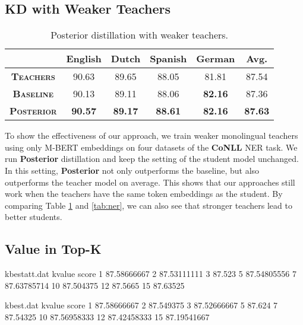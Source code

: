\documentclass[11pt,a4paper]{article}
\begin{document}
\subsection{KD with Weaker Teachers}

\begin{table}[t]
\setlength\tabcolsep{2.5pt}
\centering
\small
\begin{tabular}{c|cccc|c}
\hline\hline
 &\bf English & \bf Dutch    & \bf Spanish    & \bf German    & \bf Avg.\\
\hline
\bf\textsc{Teachers} & 90.63 & 89.65 & 88.05 & 81.81 & 87.54 \\
\hline
\bf\textsc{Baseline}      & 90.13 & 89.11 & 88.06 & \textbf{82.16} & 87.36 \\
\bf\textsc{Posterior} & \textbf{90.57} & \textbf{89.17} & \textbf{88.61} & \textbf{82.16} & \textbf{87.63} \\
\hline\hline
\end{tabular}
\caption{Posterior distillation with weaker teachers.}
\label{tab:M-BERT_posterior}
\end{table}

To show the effectiveness of our approach, we train weaker monolingual teachers using only M-BERT embeddings on four datasets of the \textbf{CoNLL} NER task. We run \textbf{Posterior} distillation and keep the setting of the student model unchanged. In this setting, \textbf{Posterior} not only outperforms the baseline, but also outperforms the teacher model on average. This shows that our approaches still work when the teachers have the same token embeddings as the student. By comparing Table \ref{tab:M-BERT_posterior} and \ref{tab:ner}, we can also see that stronger teachers lead to better students.


\subsection{ Value in Top-K}

\begin{filecontents}{kbestatt.dat}
kvalue score
1 87.58666667
2 87.53111111
3 87.523
5 87.54805556
7 87.63785714
10 87.504375
12 87.5665
15 87.63525
\end{filecontents}

\begin{filecontents}{kbest.dat}
kvalue score
1 87.58666667
2 87.549375
3 87.52666667
5 87.624
7 87.54325
10 87.56958333
12 87.42458333
15 87.19541667
\end{filecontents}
\end{document}

